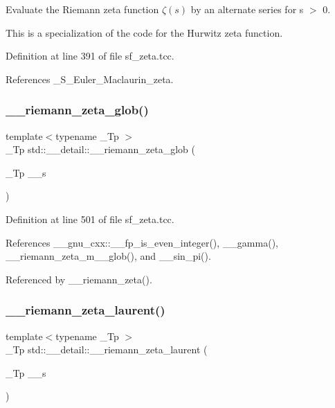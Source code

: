 Evaluate the Riemann zeta function $ \zeta(s) $ by an alternate series for s $>$ 0. 

This is a specialization of the code for the Hurwitz zeta function. 

Definition at line 391 of file sf\+\_\+zeta.\+tcc.



References \+\_\+\+S\+\_\+\+Euler\+\_\+\+Maclaurin\+\_\+zeta.

\mbox{\label{namespacestd_1_1____detail_ab3542ea44b34da3d4865ed9a014e2951}} 
\subsubsection{\texorpdfstring{\+\_\+\+\_\+riemann\+\_\+zeta\+\_\+glob()}{\_\_riemann\_zeta\_glob()}}
{\footnotesize\ttfamily template$<$typename \+\_\+\+Tp $>$ \\
\+\_\+\+Tp std\+::\+\_\+\+\_\+detail\+::\+\_\+\+\_\+riemann\+\_\+zeta\+\_\+glob (\begin{DoxyParamCaption}\item[{\+\_\+\+Tp}]{\+\_\+\+\_\+s }\end{DoxyParamCaption})}



Definition at line 501 of file sf\+\_\+zeta.\+tcc.



References \+\_\+\+\_\+gnu\+\_\+cxx\+::\+\_\+\+\_\+fp\+\_\+is\+\_\+even\+\_\+integer(), \+\_\+\+\_\+gamma(), \+\_\+\+\_\+riemann\+\_\+zeta\+\_\+m\+\_\+\_\+glob(), and \+\_\+\+\_\+sin\+\_\+pi().



Referenced by \+\_\+\+\_\+riemann\+\_\+zeta().

\mbox{\label{namespacestd_1_1____detail_a5aa95e3482a58e4bd0a7f8395f88fe1c}} 
\subsubsection{\texorpdfstring{\+\_\+\+\_\+riemann\+\_\+zeta\+\_\+laurent()}{\_\_riemann\_zeta\_laurent()}}
{\footnotesize\ttfamily template$<$typename \+\_\+\+Tp $>$ \\
\+\_\+\+Tp std\+::\+\_\+\+\_\+detail\+::\+\_\+\+\_\+riemann\+\_\+zeta\+\_\+laurent (\begin{DoxyParamCaption}\item[{\+\_\+\+Tp}]{\+\_\+\+\_\+s }\end{DoxyParamCaption})}



